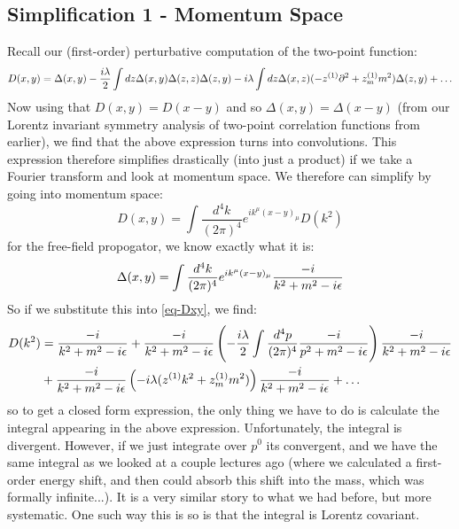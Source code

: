 \subsection{Simplification 1 - Momentum Space}
Recall our (first-order) perturbative computation of the two-point function:
\begin{equation}\label{eq-Dxy}
    D(x, y) = \Delta(x, y) - \frac{i\lambda}{2}\int dz \Delta(x, y)\Delta(z, z)\Delta(z, y) - i\lambda \int dz \Delta(x, z)(-z^{(1)}\partial^2 + z^{(1)}_m m^2)\Delta(z, y) + \ldots
\end{equation}
Now using that $D(x, y) = D(x - y)$ and so $\Delta(x, y) = \Delta(x - y)$ (from our Lorentz invariant symmetry analysis of two-point correlation functions from earlier), we find that the above expression turns into convolutions. This expression therefore simplifies drastically (into just a product) if we take a Fourier transform and look at momentum space. We therefore can simplify by going into momentum space:
\begin{equation}
    D(x, y) = \int \frac{d^4k}{(2\pi)^4}e^{ik^\mu(x - y)_\mu}D(k^2)
\end{equation}
for the free-field propogator, we know exactly what it is:
\begin{equation}
    \Delta(x, y) = \int \frac{d^4k}{(2\pi)^4}e^{ik^\mu (x - y)_\mu} \frac{-i}{k^2 + m^2 - i\epsilon}
\end{equation}
So if we substitute this into \eqref{eq-Dxy}, we find:
\begin{equation}
    \begin{split}
        D(k^2) &= \frac{-i}{k^2 + m^2 - i\epsilon} + \frac{-i}{k^2 + m^2 - i\epsilon}\left(-\frac{i\lambda}{2}\int \frac{d^4p}{(2\pi)^4}\frac{-i}{p^2 + m^2 - i\epsilon}\right)
        \frac{-i}{k^2 + m^2 - i\epsilon} 
        \\ &+ \frac{-i}{k^2 + m^2 - i\epsilon}\left(-i\lambda(z^{(1)}k^2 + z^{(1)}_m m^2)\right)\frac{-i}{k^2 + m^2 - i\epsilon} + \ldots
    \end{split}
\end{equation}
so to get a closed form expression, the only thing we have to do is calculate the integral appearing in the above expression. Unfortunately, the integral is divergent. However, if we just integrate over $p^0$ its convergent, and we have the same integral as we looked at a couple lectures ago (where we calculated a first-order energy shift, and then could absorb this shift into the mass, which was formally infinite...). It is a very similar story to what we had before, but more systematic. One such way this is so is that the integral is Lorentz covariant.


